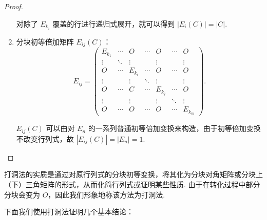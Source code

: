 \begin{proof}
\begin{enumerate}
            对除了 $E_{k_i}$ 覆盖的行进行递归式展开，就可以得到 $|E_i(C)| = |C|$.

        \item 分块初等倍加矩阵 $E_{ij}(C)$：
            \[
                E_{ij} = \begin{pmatrix}
                    E_{k_1} & \cdots & O       & \cdots & O       & \cdots & O       \\
                    \vdots  & \ddots & \vdots  &        & \vdots  &        & \vdots  \\
                    O       & \cdots & E_{k_i} & \cdots & O       & \cdots & O       \\
                    \vdots  &        & \vdots  & \ddots & \vdots  &        & \vdots  \\
                    O       & \cdots & C       & \cdots & E_{k_j} & \cdots & O       \\
                    \vdots  &        & \vdots  &        & \vdots  & \ddots & \vdots  \\
                    O       & \cdots & O       & \cdots & O       & \cdots & E_{k_m}
                \end{pmatrix}.
            \]

            $E_{ij}(C)$ 可以由对 $E_n$ 的一系列普通初等倍加变换来构造，由于初等倍加变换不改变行列式，故 $|E_{ij}(C)| = |E_n| = 1$.

    \end{enumerate}
\end{proof}

打洞法的实质是通过对原行列式的分块初等变换，将其化为分块对角矩阵或分块上（下）三角矩阵的形式，从而化简行列式或证明某些性质. 由于在转化过程中部分分块会变为 $O$，因此我们形象地称该方法为打洞法.

\vspace{1em}

下面我们使用打洞法证明几个基本结论：

\vspace{0.75em}

